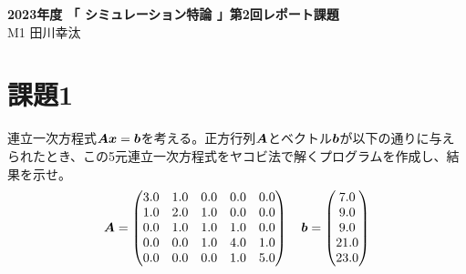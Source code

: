 \documentclass[]{jarticle}          %
\begin{document}

\vspace*{2ex}
\begin{center}
 {\Large \bf 2023年度 「 シミュレーション特論 」第2回レポート課題}\\ %
 \vspace*{5mm}
 {\large M1 田川幸汰}%
\end{center}






\section{課題1}
連立一次方程式$\mbox{\boldmath $A$}\mbox{\boldmath $x$}=\mbox{\boldmath $b$}$を考える。正方行列$\mbox{\boldmath $A$}$とベクトル$\mbox{\boldmath $b$}$が以下の通りに与えられたとき、この5元連立一次方程式をヤコビ法で解くプログラムを作成し、結果を示せ。
\begin{equation}
  \mbox{\boldmath $A$} =
  \begin{pmatrix}
    3.0 & 1.0 & 0.0 & 0.0 & 0.0 \\
    1.0 & 2.0 & 1.0 & 0.0 & 0.0 \\
    0.0 & 1.0 & 1.0 & 1.0 & 0.0 \\
    0.0 & 0.0 & 1.0 & 4.0 & 1.0 \\
    0.0 & 0.0 & 0.0 & 1.0 & 5.0
  \end{pmatrix}
  \quad
  \mbox{\boldmath $b$} = 
  \begin{pmatrix}
    7.0 \\
    9.0 \\
    9.0 \\
    21.0 \\
    23.0
  \end{pmatrix}
\end{equation}
\end{document}

